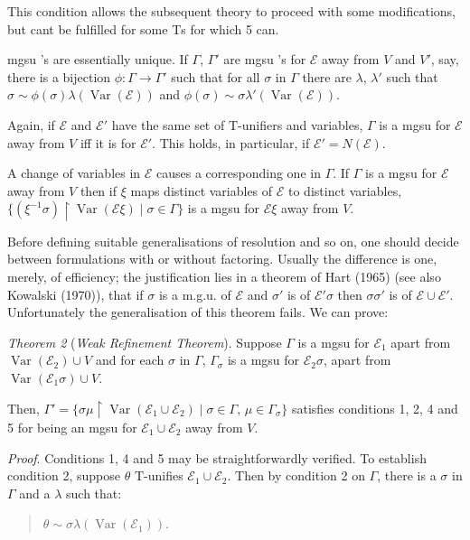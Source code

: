 \documentclass[letterpaper]{report}
\newcommand{\mgsu}{
	{\sc mgsu}%
}
\begin{document}
This condition allows the subsequent theory to proceed with some
modifications, but can\textquotesingle t be fulfilled for some
$\mathrm{T}$\textquotesingle s for which 5 can.

\mgsu's are essentially unique. If $\Gamma$,
$\Gamma'$ are \mgsu's for $\mathcal{E}$ away
from $V$ and $V'$, say, there is a bijection
$\phi\colon\Gamma{\rightarrow}\Gamma'$ such that for all
$\sigma$ in $\Gamma$ there are $\lambda$, $\lambda'$
such that
$\sigma{\sim}\phi(\sigma)\lambda(\operatorname{Var}(\mathcal{E}))$ and
$\phi(\sigma){\sim}\sigma\lambda' (\operatorname{Var}(\mathcal{E}))$.

Again, if $\mathcal{E}$ and $\mathcal{E}'$ have the same set
of $\mathrm{T}$-unifiers and variables, $\Gamma$ is a \mgsu{} for $\mathcal{E}$ away from $V$ iff it is for $\mathcal{E}'$. This holds, in
particular, if $\mathcal{E}' = N(\mathcal{E})$.

A change of variables in $\mathcal{E}$ causes a corresponding one in
$\Gamma$. If $\Gamma$ is a \mgsu{} for $\mathcal{E}$ away from $V$
then if $\xi$ maps distinct variables of $\mathcal{E}$ to distinct
variables,
$\{(\xi^{-1}\sigma) \upharpoonright \operatorname{Var}(\mathcal{E}\xi)\mid \sigma\in\Gamma\}$
is a \mgsu{} for $\mathcal{E}\xi$ away from $V$.

Before defining suitable generalisations of resolution and so on, one
should decide between formulations with or without factoring. Usually
the difference is one, merely, of efficiency; the justification lies in
a theorem of Hart (1965) (see also Kowalski (1970)), that if $\sigma$
is a m.g.u. of $\mathcal{E}$ and $\sigma'$ is of
$\mathcal{E}'\sigma$ then $\sigma\sigma'$ is of
$\mathcal{E}\cup\mathcal{E}'$. Unfortunately the
generalisation of this theorem fails. We can prove:

\noindent
\emph{Theorem 2} (\emph{Weak Refinement Theorem}). Suppose $\Gamma$
is a \mgsu{} for $\mathcal{E}_{1}$ apart from
$\operatorname{Var}\left(\mathcal{E}_{2}\right)\cup V$ and for each
$\sigma$ in $\Gamma$, $\Gamma_{\sigma}$ is a \mgsu{} for
$\mathcal{E}_{2}\sigma$, apart from
$\operatorname{Var}(\mathcal{E}_{1}\sigma)\cup V$.

Then,
$\Gamma' = \{\sigma\mu \upharpoonright \operatorname{Var}(\mathcal{E}_{1}\cup \mathcal{E}_{2})\mid \sigma \in \Gamma,\, \mu \in \Gamma_{\sigma}\}$
satisfies conditions 1, 2, 4 and 5 for being an \mgsu{} for
$\mathcal{E}_{1}\cup\mathcal{E}_{2}$ away from $V$.

\noindent
\emph{Proof}. Conditions 1, 4 and 5 may be straightforwardly verified.
To establish condition 2, suppose $\theta$ $\mathrm{T}$-unifies
$\mathcal{E}_{1}\cup\mathcal{E}_{2}$. Then by condition 2 on
$\Gamma$, there is a $\sigma$ in $\Gamma$ and a $\lambda$ such
that:
\begin{quote}
$\theta \sim \sigma\lambda(\operatorname{Var}(\mathcal{E}_{1}))$.
\end{quote}
\end{document}
